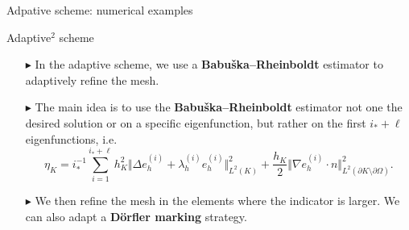 \documentclass[]{beamer}
\newcommand{\oxarrow}{\color{oxfordblue}$\blacktriangleright$}
\begin{document}
\begin{frame}{Adpative scheme: numerical examples}
{\begin{figure}
		\end{figure}
		}
	\end{frame}
	\begin{frame}{Adaptive$^2$ scheme}
	\begin{itemize}
		\item[\oxarrow] In the adaptive scheme, we use a \textbf{Babuška--Rheinboldt} estimator to adaptively refine the mesh.
		\item[\oxarrow] The main idea is to use the \textbf{Babuška--Rheinboldt} estimator not one the desired solution or on a specific eigenfunction, but rather on the first $i_{\ast}+\ell$ eigenfunctions, i.e.
		\begin{equation*}
			\eta_K\! =\! i_{\ast}^{-1}\!\!\sum_{i = 1}^{i_{\ast}+\ell}\! h^2_K \Vert \Delta e_h^{(i)} \!+\!\lambda_h^{(i)} e_h^{(i)} \Vert^2_{L^2(K)} \!+\! \frac{h_K}{2} \Vert \nabla e_h^{(i)}\! \cdot n \Vert^2_{L^2(\partial K \setminus \partial \Omega)}.
		\end{equation*}
		\item[\oxarrow] We then refine the mesh in the elements where the indicator is larger. We can also adapt a \textbf{D\"orfler marking} strategy.
	\end{itemize} 
	\end{frame}
\end{document}
